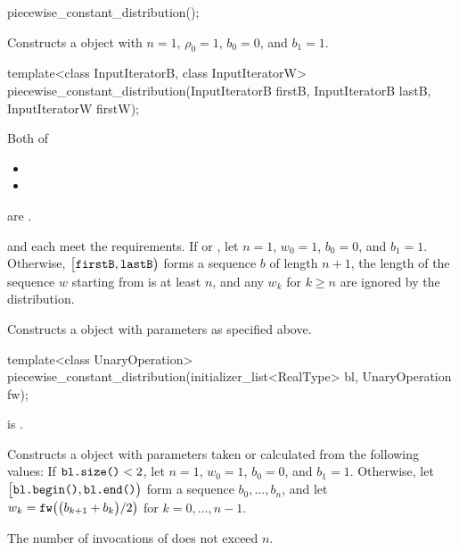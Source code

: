 %
\begin{itemdecl}
piecewise_constant_distribution();
\end{itemdecl}

\begin{itemdescr}
\pnum
\effects
Constructs a  object
 with $n = 1$,
 $\rho_0 = 1$,
 $b_0 = 0$,
 and $b_1 = 1$.
\end{itemdescr}


%
\begin{itemdecl}
template<class InputIteratorB, class InputIteratorW>
 piecewise_constant_distribution(InputIteratorB firstB, InputIteratorB lastB,
                                 InputIteratorW firstW);
\end{itemdecl}

\begin{itemdescr}
\pnum
\mandates
Both of
\begin{itemize}
\item{}
\item{}
\end{itemize}
are .

\pnum
\expects
   and 
   each meet the
   requirements.
 If 
 or ,
 let $n = 1$,
     $w_0 = 1$,
     $b_0 = 0$,
 and $b_1 = 1$.
 Otherwise,
 $\bigl[\texttt{firstB}, \texttt{lastB}\bigr)$
 forms a sequence $b$ of length $n+1$,
 the length of the sequence $w$ starting from 
 is at least $n$,
 and any $w_k$ for  $k \geq n$ are ignored by the distribution.

\pnum
\effects
Constructs a  object
 with parameters as specified above.
\end{itemdescr}


%
\begin{itemdecl}
template<class UnaryOperation>
 piecewise_constant_distribution(initializer_list<RealType> bl, UnaryOperation fw);
\end{itemdecl}

\begin{itemdescr}
\pnum
\mandates
{} is .

\pnum
\effects
Constructs a  object
 with parameters taken or calculated
 from the following values:
 If $\texttt{bl.size()} < 2$,
 let $n = 1$,
     $w_0 = 1$,
     $b_0 = 0$,
 and $b_1 = 1$.
 Otherwise,
 let $\bigl[\texttt{bl.begin()}, \texttt{bl.end()}\bigr)$
 form a sequence $b_0, \dotsc, b_n$,
 and
 let $w_k = \texttt{fw}\bigl(\bigl(b_{k+1} + b_k\bigr) / 2\bigr)$
 for $k = 0, \dotsc, n - 1$.

\pnum
\complexity
The number of invocations of  does not exceed $n$.
\end{itemdescr}


